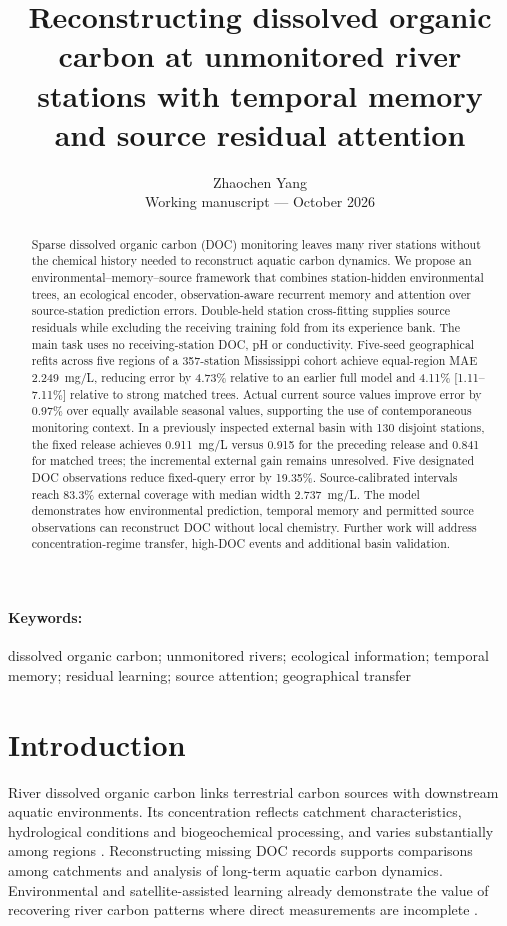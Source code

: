 \documentclass[11pt]{article}
\title{Reconstructing dissolved organic carbon at unmonitored river stations with temporal memory and source residual attention}
\author{Zhaochen Yang\\[2pt]\small Working manuscript --- October 2026}
\date{}
\begin{document}
\maketitle

\begin{abstract}
Sparse dissolved organic carbon (DOC) monitoring leaves many river stations without the chemical history needed to reconstruct aquatic carbon dynamics. We propose an environmental--memory--source framework that combines station-hidden environmental trees, an ecological encoder, observation-aware recurrent memory and attention over source-station prediction errors. Double-held station cross-fitting supplies source residuals while excluding the receiving training fold from its experience bank. The main task uses no receiving-station DOC, pH or conductivity. Five-seed geographical refits across five regions of a 357-station Mississippi cohort achieve equal-region MAE 2.249~mg/L, reducing error by 4.73\% relative to an earlier full model and 4.11\% [1.11--7.11\%] relative to strong matched trees. Actual current source values improve error by 0.97\% over equally available seasonal values, supporting the use of contemporaneous monitoring context. In a previously inspected external basin with 130 disjoint stations, the fixed release achieves 0.911~mg/L versus 0.915 for the preceding release and 0.841 for matched trees; the incremental external gain remains unresolved. Five designated DOC observations reduce fixed-query error by 19.35\%. Source-calibrated intervals reach 83.3\% external coverage with median width 2.737~mg/L. The model demonstrates how environmental prediction, temporal memory and permitted source observations can reconstruct DOC without local chemistry. Further work will address concentration-regime transfer, high-DOC events and additional basin validation.
\end{abstract}
\paragraph{Keywords:} dissolved organic carbon; unmonitored rivers; ecological information; temporal memory; residual learning; source attention; geographical transfer

\section{Introduction}
River dissolved organic carbon links terrestrial carbon sources with downstream aquatic environments. Its concentration reflects catchment characteristics, hydrological conditions and biogeochemical processing, and varies substantially among regions \citep{yang2017}. Reconstructing missing DOC records supports comparisons among catchments and analysis of long-term aquatic carbon dynamics. Environmental and satellite-assisted learning already demonstrate the value of recovering river carbon patterns where direct measurements are incomplete \citep{tian2025}.
\end{document}
